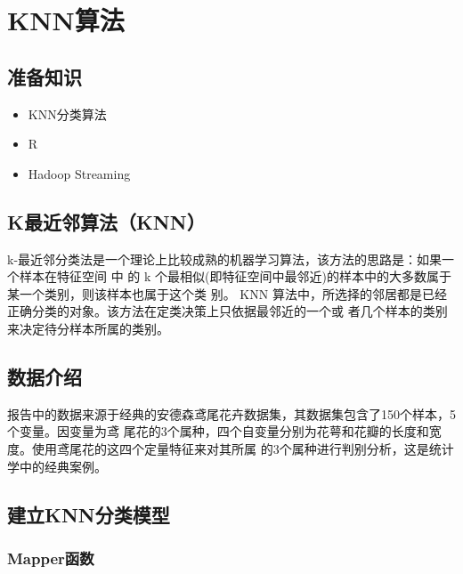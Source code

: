 \section{KNN算法}\label{ux5b9eux4f8bux5206ux6790mapreduce-ux6846ux67b6ux4e0bux7684-knn-ux7b97ux6cd5ux5b9eux73b0}

\subsection{准备知识}\label{ux51c6ux5907ux77e5ux8bc6}

\begin{itemize}
\itemsep1pt\parskip0pt
\item
  KNN分类算法
\item
  R
\item
  Hadoop Streaming
\end{itemize}

\subsection{K最近邻算法（KNN）}\label{kux6700ux8fd1ux90bbux7b97ux6cd5knn}

k-最近邻分类法是一个理论上比较成熟的机器学习算法，该方法的思路是：如果一个样本在特征空间
中 的 k 个最相似(即特征空间中最邻近)的样本中的大多数属于某一个类别，则该样本也属于这个类
别。 KNN 算法中，所选择的邻居都是已经正确分类的对象。该方法在定类决策上只依据最邻近的一个或
者几个样本的类别来决定待分样本所属的类别。

\subsection{数据介绍}\label{ux6570ux636eux4ecbux7ecd}
报告中的数据来源于经典的安德森鸢尾花卉数据集，其数据集包含了150个样本，5个变量。因变量为鸢
尾花的3个属种，四个自变量分别为花萼和花瓣的长度和宽度。使用鸢尾花的这四个定量特征来对其所属
的3个属种进行判别分析，这是统计学中的经典案例。

\subsection{建立KNN分类模型}\label{ux5efaux7acbknnux5206ux7c7bux6a21ux578b}

\subsubsection{Mapper函数}\label{mapperux51fdux6570}

